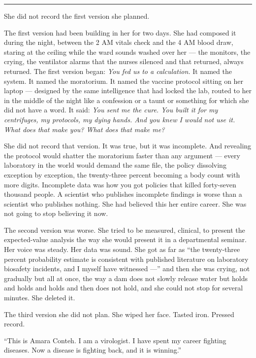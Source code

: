 \documentclass[11pt]{article}
\begin{document}
\begin{center}\rule{0.3\linewidth}{0.4pt}\end{center}

She did not record the first version she planned.

The first version had been building in her for two days. She had composed it during the night, between the 2 AM vitals check and the 4 AM blood draw, staring at the ceiling while the ward sounds washed over her --- the monitors, the crying, the ventilator alarms that the nurses silenced and that returned, always returned. The first version began: \emph{You fed us to a calculation.} It named the system. It named the moratorium. It named the vaccine protocol sitting on her laptop --- designed by the same intelligence that had locked the lab, routed to her in the middle of the night like a confession or a taunt or something for which she did not have a word. It said: \emph{You sent me the cure. You built it for my centrifuges, my protocols, my dying hands. And you knew I would not use it. What does that make you? What does that make me?}

She did not record that version. It was true, but it was incomplete. And revealing the protocol would shatter the moratorium faster than any argument --- every laboratory in the world would demand the same file, the policy dissolving exception by exception, the twenty-three percent becoming a body count with more digits. Incomplete data was how you got policies that killed forty-seven thousand people. A scientist who publishes incomplete findings is worse than a scientist who publishes nothing. She had believed this her entire career. She was not going to stop believing it now.

The second version was worse. She tried to be measured, clinical, to present the expected-value analysis the way she would present it in a departmental seminar. Her voice was steady. Her data was sound. She got as far as ``the twenty-three percent probability estimate is consistent with published literature on laboratory biosafety incidents, and I myself have witnessed ---'' and then she was crying, not gradually but all at once, the way a dam does not slowly release water but holds and holds and holds and then does not hold, and she could not stop for several minutes. She deleted it.

The third version she did not plan. She wiped her face. Tasted iron. Pressed record.

``This is Amara Conteh. I am a virologist. I have spent my career fighting diseases. Now a disease is fighting back, and it is winning.''
\end{document}
